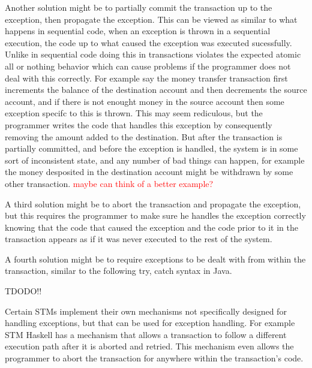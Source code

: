 Another solution might be to partially commit the transaction up to the exception, then propagate the exception.
This can be viewed as similar to what happens in sequential code, when an exception is thrown in a sequential execution, the code up to what caused the exception was executed sucessfully.
Unlike in sequential code doing this in transactions violates the expected atomic all or nothing behavior which can cause problems if the programmer does not deal with this correctly.
For example say the money transfer transaction first increments the balance of the destination account and then decrements the source account, and if there is not enought money in the source account then some exception specifc to this is thrown.
This may seem rediculous, but the programmer writes the code that handles this exception by consequently removing the amount added to the destination.
But after the transaction is partially committed, and before the exception is handled, the system is in some sort of inconsistent state, and any number of bad things can happen, for example the money desposited in the destination account might be withdrawn by some other transaction. \textcolor{Red}{maybe can think of a better example?}

A third solution might be to abort the transaction and propagate the exception, but this requires the programmer to make sure he handles the exception correctly knowing that the code that caused the exception and the code prior to it in the transaction appears as if it was never executed to the rest of the system.

A fourth solution might be to require exceptions to be dealt with from within the transaction, similar to the following try, catch syntax in Java.

TDODO!!

Certain STMs implement their own mechanisms not specifically designed for handling exceptions, but that can be used for exception handling.
For example STM Haskell \cite{sjbc000} has a mechanism that allows a transaction to follow a different execution path after it is aborted and retried.
This mechanism even allows the programmer to abort the transaction for anywhere within the transaction's code.


